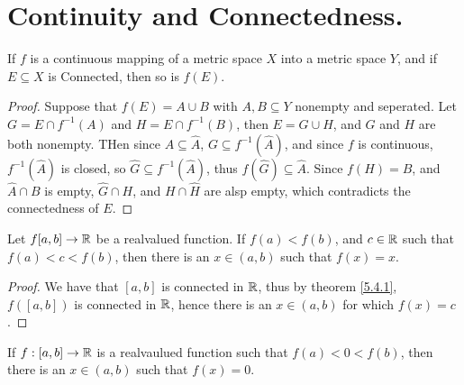 
\section{Continuity and Connectedness.}

\begin{theorem}\label{5.4.1}
    If $f$ is a continuous mapping of a metric space  $X$ into a metric space  $Y$, and 
    if  $E \subseteq X$ is Connected, then so is  $f(E)$.
\end{theorem}
\begin{proof}
    Suppose that $f(E)=A \cup B$ with  $A,B \subseteq Y$ nonempty and seperated. Let 
    $G=E \cap f^{-1}(A)$ and  $H=E \cap f^{-1}(B)$, then  $E=G \cup H$, and  $G$ and  $H$ are both 
    nonempty. THen since  $A \subseteq \hat{A}$,  $G \subseteq f^{-1}(\hat{A})$, and since  $f$ is continuous, 
    $f^{-1}(\hat{A})$ is closed, so  $\hat{G} \subseteq f^{-1}(\hat{A})$, thus  $f(\hat{G}) \subseteq \hat{A}$. 
    Since  $f(H)=B$, and  $\hat{A} \cap B$ is empty,  $\hat{G} \cap H$, and $H \cap \hat{H}$ are 
    alsp empty, which contradicts the connectedness of $E$.
\end{proof}

\begin{theorem}\label{5.4.2}
    Let $f[a,b] \rightarrow \mathbb{R}$ be a realvalued function. If  $f(a)<f(b)$, and  $c \in \mathbb{R}$ such that 
    $f(a)<c<f(b)$, then there is an  $x \in (a,b)$ such that $f(x)=x$.
\end{theorem}
\begin{proof}
    We have that $[a,b]$ is connected in  $\mathbb{R}$, thus by theorem \ref{5.4.1}, $f([a,b])$ is 
    connected in $\mathbb{R}$, hence there is an  $x \in  (a,b)$ for which $f(x)=c$.
\end{proof}

\begin{corollary}
    If $f:[a,b] \rightarrow \mathbb{R}$ is a realvaulued function such that $f(a)<0<f(b)$, then 
    there is an $x \in (a,b)$ such that $f(x)=0$.
\end{corollary}

